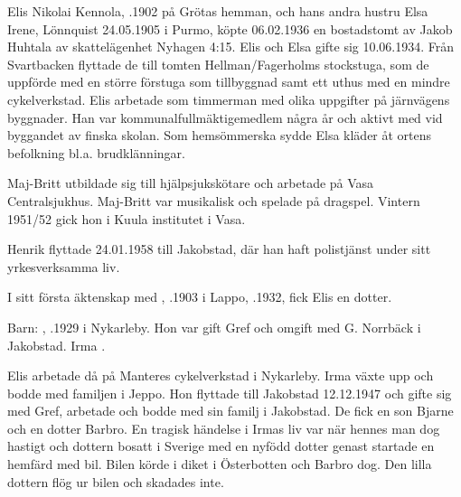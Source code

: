%
Elis Nikolai Kennola, .1902 på Grötas hemman, och hans	andra hustru Elsa Irene, \textborn Lönnquist 24.05.1905 i Purmo, köpte	06.02.1936 en bostadstomt av Jakob Huhtala av skattelägenhet Nyhagen 4:15. Elis och Elsa gifte sig 10.06.1934. Från Svartbacken flyttade de till tomten Hellman/Fagerholms stockstuga, som de uppförde med en större förstuga som tillbyggnad samt ett uthus med en mindre cykelverkstad. Elis arbetade som timmerman med olika uppgifter på järnvägens byggnader. Han var kommunalfullmäktigemedlem några år och aktivt med vid byggandet av finska skolan. Som hemsömmerska sydde Elsa kläder åt ortens befolkning bl.a. brudklänningar.
\begin{jhchildren}
  \item {}
  \item {}
\end{jhchildren}

Maj-Britt utbildade sig till hjälpsjukskötare och arbetade på Vasa Centralsjukhus. Maj-Britt var musikalisk och spelade på dragspel. Vintern 1951/52 gick hon i Kuula institutet i Vasa.

Henrik flyttade 24.01.1958 till Jakobstad, där han haft polistjänst under sitt yrkesverksamma liv.


I sitt första äktenskap med , .1903 i Lappo, .1932, fick Elis en dotter.

Barn: , .1929 i Nykarleby. Hon var gift Gref och omgift med G. Norrbäck i Jakobstad. Irma .

Elis arbetade då på Manteres cykelverkstad i Nykarleby. Irma växte upp och bodde med familjen i Jeppo. Hon flyttade till Jakobstad 12.12.1947 och gifte sig med Gref, arbetade och bodde med sin familj i Jakobstad. De fick en son Bjarne och en dotter Barbro. En tragisk	händelse i Irmas liv var när hennes man dog hastigt och dottern	bosatt i Sverige med en nyfödd dotter genast startade en hemfärd med 	bil. Bilen körde i diket i Österbotten och Barbro dog. Den lilla dottern flög ur bilen och skadades inte.

